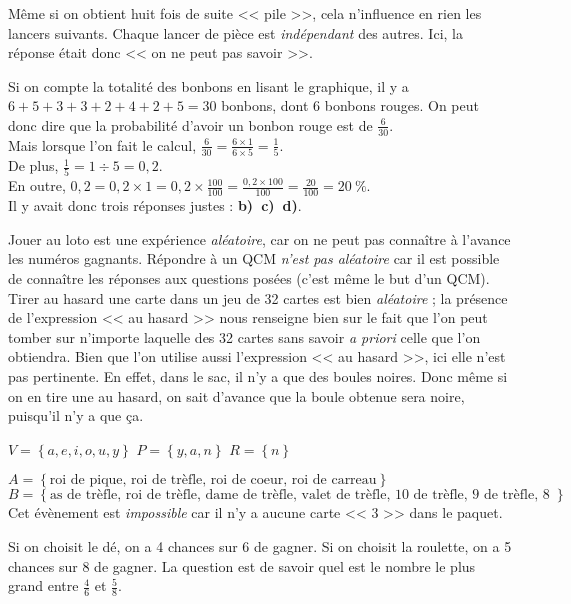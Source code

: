 \documentclass[../Cours.tex]{subfiles}
\begin{document}
\begin{questions}
    \exercice Même si on obtient huit fois de suite << pile >>, cela n'influence en rien les lancers suivants. Chaque lancer de pièce est \emph{indépendant} des autres. Ici, la réponse était donc << on ne peut pas savoir >>.

    \exercice Si on compte la totalité des bonbons en lisant le graphique, il y a $6+5+3+3+2+4+2+5=30$ bonbons, dont 6 bonbons rouges. On peut donc dire que la probabilité d'avoir un bonbon rouge est de $\frac{6}{30}$. \\
    Mais lorsque l'on fait le calcul, $\frac{6}{30} = \frac{6 \times 1}{6 \times 5} = \frac{1}{5}$.\\
    De plus, $\frac{1}{5} = 1 \div 5 = 0{,}2$.\\
    En outre, $0,2 = 0,2 \times 1 = 0,2 \times \frac{100}{100} = \frac{0,2 \times 100}{100} = \frac{20}{100} = 20~\%$.\\
    Il y avait donc trois réponses justes : \textbf{b)~c)~d)}.

    \exercice 
    \question Jouer au loto est une expérience \emph{aléatoire}, car on ne peut pas connaître à l'avance les numéros gagnants.
    \question Répondre à un QCM \emph{n'est pas aléatoire} car il est possible de connaître les réponses aux questions posées (c'est même le but d'un QCM).
    \question Tirer au hasard une carte dans un jeu de 32 cartes est bien \emph{aléatoire} ; la présence de l'expression << au hasard >> nous renseigne bien sur le fait que l'on peut tomber sur n'importe laquelle des 32 cartes sans savoir \emph{a priori} celle que l'on obtiendra.
    \question Bien que l'on utilise aussi l'expression << au hasard >>, ici elle n'est pas pertinente. En effet, dans le sac, il n'y a que des boules noires. Donc même si on en tire une au hasard, on sait d'avance que la boule obtenue sera noire, puisqu'il n'y a que ça.

    \exercice 
    \question $V = \left\{ a, e, i, o, u, y \right\}$
    \question $P = \left\{ y, a, n \right\}$
    \question $R = \left\{ n \right\}$

    \exercice 
    \question
        \subquestion $A = \left\{ \mbox{roi de pique, roi de trèfle, roi de coeur, roi de carreau} \right\}$
        \subquestion $B = \left\{ \mbox{as de trèfle, roi de trèfle, dame de trèfle, valet de trèfle, 10 de trèfle, 9 de trèfle, 8 de trèfle, 7 de trèfle} \right\}$
    \question Cet évènement est \emph{impossible} car il n'y a aucune carte << 3 >> dans le paquet.

    \exercice Si on choisit le dé, on a 4 chances sur 6 de gagner. Si on choisit la roulette, on a 5 chances sur 8 de gagner. La question est de savoir quel est le nombre le plus grand entre $\frac{4}{6}$ et $\frac{5}{8}$.\\


\end{questions}
\end{document}
